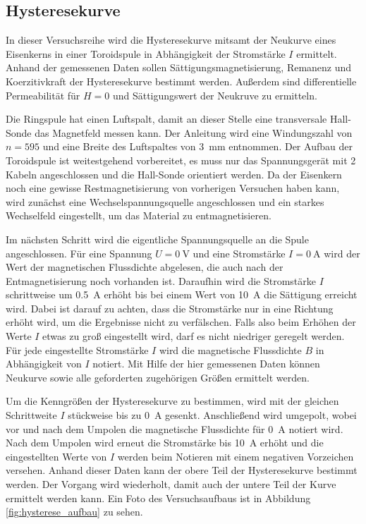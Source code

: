 \subsection{Hysteresekurve}
\label{sec:A_Hysterese_Drcf}
In dieser Versuchsreihe wird die Hysteresekurve mitsamt der Neukurve eines Eisenkerns in einer Toroidspule 
in Abhängigkeit der Stromstärke $I$ ermittelt.
Anhand der gemessenen Daten sollen Sättigungsmagnetisierung, Remanenz und Koerzitivkraft der Hysteresekurve bestimmt werden.
Außerdem sind differentielle Permeabilität für $H = 0$ und Sättigungswert der Neukruve zu ermitteln.

\noindent
Die Ringspule hat einen Luftspalt, damit an dieser Stelle eine transversale Hall-Sonde das Magnetfeld messen kann.
Der Anleitung wird eine Windungszahl von $n = 595$ und eine Breite des Luftspaltes von \qty[]{3}{\mm} entnommen.
Der Aufbau der Toroidspule ist weitestgehend vorbereitet, es muss nur das Spannungsgerät mit 2 Kabeln angeschlossen und die Hall-Sonde orientiert werden.
Da der Eisenkern noch eine gewisse Restmagnetisierung von vorherigen Versuchen haben kann,
wird zunächst eine Wechselspannungsquelle angeschlossen und ein starkes Wechselfeld eingestellt, um das Material zu entmagnetisieren.

\noindent
Im nächsten Schritt wird die eigentliche Spannungsquelle an die Spule angeschlossen.
Für eine Spannung $U = \qty[]{0}{\volt}$ und eine Stromstärke $I = \qty[]{0}{\ampere}$ wird der Wert der magnetischen Flussdichte abgelesen, 
die auch nach der Entmagnetisierung noch vorhanden ist.
Daraufhin wird die Stromstärke $I$ schrittweise um \qty[]{0.5}{\ampere} erhöht bis bei einem Wert von \qty[]{10}{\ampere} die Sättigung erreicht wird.
Dabei ist darauf zu achten, dass die Stromstärke nur in eine Richtung erhöht wird, um die Ergebnisse nicht zu verfälschen.
Falls also beim Erhöhen der Werte $I$ etwas zu groß eingestellt wird, darf es nicht niedriger geregelt werden.
Für jede eingestellte Stromstärke $I$ wird die magnetische Flussdichte $B$ in Abhängigkeit von $I$ notiert.
Mit Hilfe der hier gemessenen Daten können Neukurve sowie alle geforderten zugehörigen Größen ermittelt werden.

\noindent
Um die Kenngrößen der Hysteresekurve zu bestimmen, wird mit der gleichen Schrittweite $I$ stückweise bis zu \qty[]{0}{\ampere} gesenkt.
Anschließend wird umgepolt, wobei vor und nach dem Umpolen die magnetische Flussdichte für \qty[]{0}{\ampere} notiert wird.
Nach dem Umpolen wird erneut die Stromstärke bis \qty[]{10}{\ampere} erhöht und die eingestellten Werte von $I$ werden beim Notieren
mit einem negativen Vorzeichen versehen.
Anhand dieser Daten kann der obere Teil der Hysteresekurve bestimmt werden.
Der Vorgang wird wiederholt, damit auch der untere Teil der Kurve ermittelt werden kann.
Ein Foto des Versuchsaufbaus ist in Abbildung \ref{fig:hysterese_aufbau} zu sehen.


